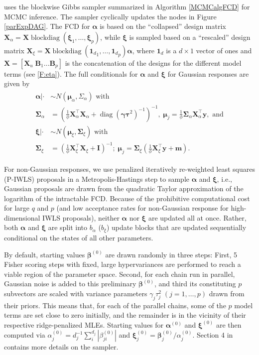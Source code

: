 \documentclass[article, shortnames, nojss, noheadings, notitle]{jss}
\begin{document}
 uses the blockwise Gibbs sampler summarized in Algorithm \ref{MCMCalgFCD} for MCMC inference.
The sampler cyclically updates the nodes in Figure \ref{parExpDAG}.
The FCD for $\bm\alpha$ is based on the ``collapsed'' design matrix \mbox{$\bm X_\alpha = \bm
X \operatorname{blockdiag}(\bm\xi_1,\dots,\bm\xi_p)$}, while $\bm\xi$
is sampled based on a ``rescaled'' design matrix \mbox{$\bm X_\xi = \bm X
\operatorname{blockdiag}({\bm 1_d}_1,\dots,{\bm 1_d}_p)\bm\alpha$},
where $\bm 1_d$ is a $d \times 1$ vector of ones and $\bm X = \left[\bm X_u\; \bm B_1 \ldots  \bm B_p \right]$
is the concatenation of the designs for the different model terms (see \eqref{F:eta}).
The full conditionals for $\bm\alpha$ and $\bm\xi$ for Gaussian responses are
given by
\begin{align}
\begin{split}
 \bm\alpha|\cdot &\sim N(\bm \mu_{\alpha}, \Sigma_{\alpha}) \text{ with}\\
 \bm \Sigma_{\alpha} &= \left(\frac{1}{\phi}\bm X_\alpha^\top\bm X_\alpha +
\operatorname{diag}\left(\bm \gamma \bm \tau^2\right)^{-1}\right)^{-1}, \; \bm\mu_j
=\frac{1}{\phi}\bm\Sigma_\alpha\bm X_\alpha^\top\bm y,
\text{ and}\\
 \bm\xi|\cdot &\sim N(\bm \mu_{\xi}, \bm \Sigma_{\xi}) \text{ with}\\
 \bm \Sigma_{\xi} &= \left(\frac{1}{\phi}\bm X_\xi^\top\bm X_\xi +
\bm I \right)^{-1}; \; \bm\mu_j
=\bm\Sigma_\xi\left(\frac{1}{\phi}\bm X_\xi^\top\bm y + \bm m \right).
\end{split}\label{F:FCDCoef}
\end{align}

For non-Gaussian responses, we use penalized iteratively re-weighted least squares (P-IWLS)
proposals \citep{Lang:Brezger:2004} in a Metropolis-Hastings step
to sample $\bm \alpha$ and $\bm \xi$, i.e., Gaussian proposals are drawn from the quadratic Taylor
approximation of the logarithm of the intractable FCD. Because of the prohibitive computational cost for large $q$ and $p$
(and low acceptance rates for non-Gaussian response for high-dimensional IWLS proposals),
neither $\bm \alpha$ nor $\bm \xi$ are updated all at once. Rather, both $\bm \alpha$ and $\bm \xi$ are split
into $b_\alpha$ ($b_\xi$) update blocks that are updated sequentially conditional on the states of all
other parameters.

By default, starting values $\bm \beta^{(0)}$ are drawn randomly in three steps:
First, 5 Fisher scoring steps with fixed, large hypervariances are performed to reach a viable region of the parameter space.
Second, for each chain run in parallel, Gaussian noise is added to this preliminary $\bm \beta^{(0)}$,
and third its constituting
$p$ subvectors are scaled with
variance parameters $\gamma_j\tau_j^2\;( j=1,\dots,p)$ drawn from their priors.
This means that, for each of the parallel chains, some of the $p$ model terms are set
close to zero initially, and the remainder is in the vicinity of their respective ridge-penalized MLEs.
Starting values for
$\bm\alpha^{(0)}$ and $\bm\xi^{(0)}$ are then computed via $
\alpha^{(0)}_j = d_j^{-1} \sum_i^{d_j} |\beta^{(0)}_{ji}|$ and $\bm \xi^{(0)}_j = \bm\beta^{(0)}_j / \alpha^{(0)}_j$.
Section 4 in \citet{Scheipl:2010} contains more details on the
sampler.
\end{document}
